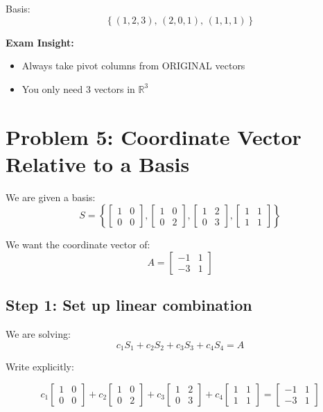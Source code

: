 \documentclass[11pt]{article}
\begin{document}
Basis:
\[
\left\{
(1,2,3),\,
(2,0,1),\,
(1,1,1)
\right\}
\]

\textbf{Exam Insight:}
\begin{itemize}
    \item Always take pivot columns from ORIGINAL vectors
    \item You only need 3 vectors in $\mathbb{R}^3$
\end{itemize}

\hrulefill

\section*{Problem 5: Coordinate Vector Relative to a Basis}

We are given a basis:
\[
S =
\left\{
\begin{bmatrix}1 & 0 \\ 0 & 0\end{bmatrix},
\begin{bmatrix}1 & 0 \\ 0 & 2\end{bmatrix},
\begin{bmatrix}1 & 2 \\ 0 & 3\end{bmatrix},
\begin{bmatrix}1 & 1 \\ 1 & 1\end{bmatrix}
\right\}
\]

We want the coordinate vector of:
\[
A =
\begin{bmatrix}
-1 & 1 \\
-3 & 1
\end{bmatrix}
\]

\subsection*{Step 1: Set up linear combination}

We are solving:
\[
c_1 S_1 + c_2 S_2 + c_3 S_3 + c_4 S_4 = A
\]

Write explicitly:

\[
c_1
\begin{bmatrix}1 & 0 \\ 0 & 0\end{bmatrix}
+
c_2
\begin{bmatrix}1 & 0 \\ 0 & 2\end{bmatrix}
+
c_3
\begin{bmatrix}1 & 2 \\ 0 & 3\end{bmatrix}
+
c_4
\begin{bmatrix}1 & 1 \\ 1 & 1\end{bmatrix}
=
\begin{bmatrix}-1 & 1 \\ -3 & 1\end{bmatrix}
\]
\end{document}
